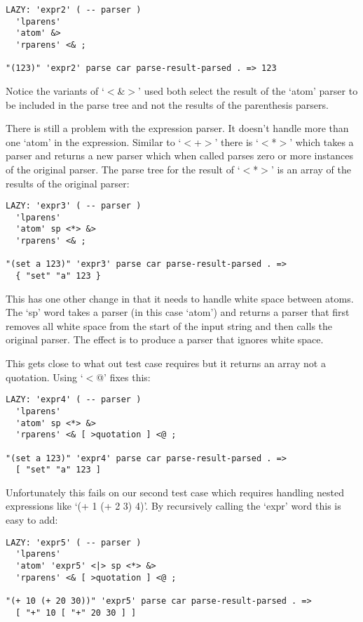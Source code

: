 \begin{verbatim}
LAZY: 'expr2' ( -- parser )
  'lparens' 
  'atom' &>
  'rparens' <& ;

"(123)" 'expr2' parse car parse-result-parsed . => 123
\end{verbatim}

Notice the variants of `$<$\&$>$' used both select the result of the `atom'
parser to be included in the parse tree and not the results of the
parenthesis parsers.

There is still a problem with the expression parser. It doesn't handle
more than one `atom' in the expression. Similar to `$<$+$>$' there is
`$<$*$>$' which takes a parser and returns a new parser which when called
parses zero or more instances of the original parser. The parse tree
for the result of `$<$*$>$' is an array of the results of the original
parser:

\begin{verbatim}
LAZY: 'expr3' ( -- parser )
  'lparens' 
  'atom' sp <*> &>
  'rparens' <& ;

"(set a 123)" 'expr3' parse car parse-result-parsed . => 
  { "set" "a" 123 }
\end{verbatim}

This has one other change in that it needs to handle white space
between atoms. The `sp' word takes a parser (in this case `atom') and
returns a parser that first removes all white space from the start of
the input string and then calls the original parser. The effect is to
produce a parser that ignores white space.

This gets close to what out test case requires but it returns an array
 not a quotation. Using `$<$@' fixes this:

\begin{verbatim}
LAZY: 'expr4' ( -- parser )
  'lparens' 
  'atom' sp <*> &>
  'rparens' <& [ >quotation ] <@ ;

"(set a 123)" 'expr4' parse car parse-result-parsed . => 
  [ "set" "a" 123 ]
\end{verbatim}

Unfortunately this fails on our second test case which requires
handling nested expressions like `(+ 1 (+ 2 3) 4)'. By recursively
calling the `expr' word this is easy to add:

\begin{verbatim}
LAZY: 'expr5' ( -- parser )
  'lparens' 
  'atom' 'expr5' <|> sp <*> &>
  'rparens' <& [ >quotation ] <@ ;

"(+ 10 (+ 20 30))" 'expr5' parse car parse-result-parsed . => 
  [ "+" 10 [ "+" 20 30 ] ]
\end{verbatim}

